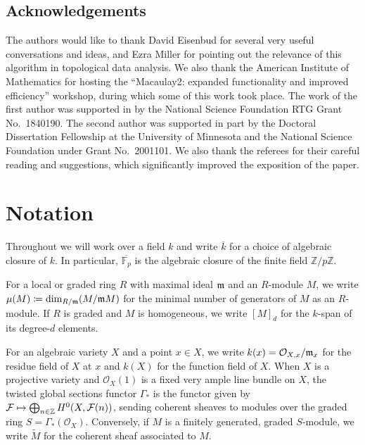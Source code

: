\documentclass[12pt]{article}
\let\wtilde\widetilde
\def\cF{\mathcal F}
\def\OO{\mathcal O}
\def\FF{\mathbb F}
\def\ZZ{\mathbb Z}
\theoremstyle{theorem}
\numberwithin{thm}{section}
\theoremstyle{definition}
\begin{document}
\subsection*{Acknowledgements}

The authors would like to thank David Eisenbud for several very useful conversations and ideas, and Ezra Miller for pointing out the relevance of this algorithm in topological data analysis.
We also thank the American Institute of Mathematics for hosting the ``Macaulay2: expanded functionality and improved efficiency'' workshop, during which some of this work took place.
The work of the first author was supported in by the National Science Foundation RTG Grant No.~1840190.
The second author was supported in part by the Doctoral Dissertation Fellowship at the University of Minnesota and the National Science Foundation under Grant No.~2001101.
We also thank the referees for their careful reading and suggestions, which significantly improved the exposition of the paper.

\section{Notation}

Throughout we will work over a field $k$ and write $\overline k$ for a choice of algebraic closure of $k$. \linebreak In particular, $\overline{\FF_p}$ is the algebraic closure of the finite field $\ZZ/p\ZZ$.

For a local or graded ring $R$ with maximal ideal $\mathfrak m$ and an $R$-module $M$, we write $\mu(M)\coloneqq\dim_{R/\mathfrak m}(M/\mathfrak m M)$ for the minimal number of generators of $M$ as an $R$-module.
If $R$ is graded and $M$ is homogeneous, we write $[M]_d$ for the $k$-span of its degree-$d$ elements.

For an algebraic variety $X$ and a point $x\in X$, we write $k(x)=\OO_{X,x}/\m_x$ for the residue field of $X$ at $x$ and $k(X)$ for the function field of $X$.
%
When $X$ is a projective variety and $\OO_X(1)$ is a fixed very ample line bundle on $X$, the twisted global sections functor $\Gamma_*$ is the functor given by $\cF \mapsto \bigoplus_{n\in \Z} H^0(X, \cF(n))$, sending coherent sheaves to modules over the graded ring $S = \Gamma_*(\OO_X)$. Conversely, if $M$ is a finitely generated, graded $S$-module, we write $\wtilde M$ for the coherent sheaf associated to $M$.
\end{document}
